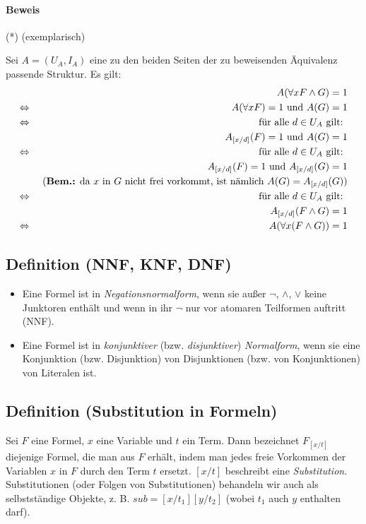 \documentclass[a4paper]{scrartcl}
\begin{document}
\paragraph{Beweis} (*) (exemplarisch)

Sei $A=(U_A,I_A)$ eine zu den beiden Seiten der zu beweisenden Äquivalenz passende Struktur. Es gilt:
\begin{eqnarray*}
	& &A(\forall xF \wedge G) = 1 \\
	\Leftrightarrow & & A(\forall xF) = 1 \text{ und } A(G) = 1 \\
	\Leftrightarrow & & \text{ für alle } d\in U_A \text{ gilt: } \\
	& & A_{[x/d]}(F) = 1 \text{ und } A(G) = 1 \\
	\Leftrightarrow & & \text{ für alle } d\in U_A \text{ gilt: } \\
	& & A_{[x/d]}(F) = 1 \text{ und } A_{[x/d]}(G) = 1\\
	& & \text{\ (\textbf{Bem.:} da $x$ in $G$ nicht frei vorkommt, ist nämlich $A(G)=A_{[x/d]}(G)$)} \\
	\Leftrightarrow & & \text{ für alle } d\in U_A \text{ gilt: } \\
	& & A_{[x/d]}(F\wedge G) = 1 \\
	\Leftrightarrow & & A(\forall x(F\wedge G)) = 1
\end{eqnarray*}

\subsection{Definition (NNF, KNF, DNF)}

\begin{itemize}
\item Eine Formel ist in \emph{Negationsnormalform}, wenn sie außer $\neg$, $\wedge$, $\vee$ keine Junktoren enthält und wenn in ihr $\neg$ nur vor atomaren Teilformen auftritt (NNF).
\item Eine Formel ist in \emph{konjunktiver} (bzw. \emph{disjunktiver}) \emph{Normalform}, wenn sie eine Konjunktion (bzw. Disjunktion) von Disjunktionen (bzw. von Konjunktionen) von Literalen ist.
\end{itemize}

\subsection{Definition (Substitution in Formeln)}

Sei $F$ eine Formel, $x$ eine Variable und $t$ ein Term. Dann bezeichnet $F_{[x/t]}$ diejenige Formel, die man aus $F$ erhält, indem man jedes freie Vorkommen der Variablen $x$ in $F$ durch den Term $t$ ersetzt. $[x/t]$ beschreibt eine \emph{Substitution}. Substitutionen (oder Folgen von Substitutionen) behandeln wir auch als selbstständige Objekte, z. B. $sub=[x/t_1][y/t_2]$ (wobei $t_1$ auch $y$ enthalten darf).
\end{document}
